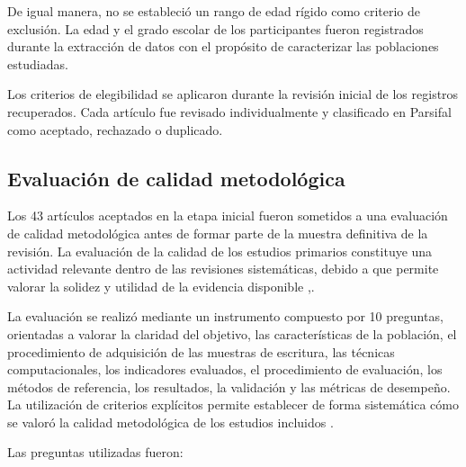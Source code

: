 \documentclass{iaesarticle}
\begin{document}
De igual manera, no se estableció un rango de edad rígido como criterio de exclusión. La edad y el grado escolar de los participantes fueron registrados durante la extracción de datos con el propósito de caracterizar las poblaciones estudiadas.

Los criterios de elegibilidad se aplicaron durante la revisión inicial de los registros recuperados. Cada artículo fue revisado individualmente y clasificado en Parsifal como aceptado, rechazado o duplicado.

\subsection{Evaluación de calidad metodológica}

Los 43 artículos aceptados en la etapa inicial fueron sometidos a una evaluación de calidad metodológica antes de formar parte de la muestra definitiva de la revisión. La evaluación de la calidad de los estudios primarios constituye una actividad relevante dentro de las revisiones sistemáticas, debido a que permite valorar la solidez y utilidad de la evidencia disponible \cite{kitchenham2010},\cite{kitchenham2013}.

La evaluación se realizó mediante un instrumento compuesto por 10 preguntas, orientadas a valorar la claridad del objetivo, las características de la población, el procedimiento de adquisición de las muestras de escritura, las técnicas computacionales, los indicadores evaluados, el procedimiento de evaluación, los métodos de referencia, los resultados, la validación y las métricas de desempeño. La utilización de criterios explícitos permite establecer de forma sistemática cómo se valoró la calidad metodológica de los estudios incluidos \cite{yang2021}.

Las preguntas utilizadas fueron:
\end{document}
